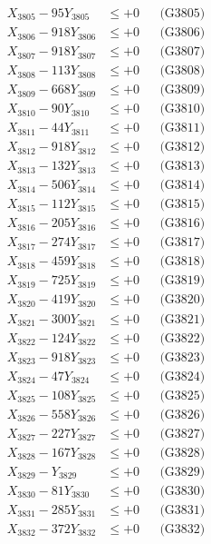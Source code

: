 \documentclass[a4paper,10pt]{article}
\begin{document}
{\begin{align}
X_{3805} - 95Y_{3805} &\leq +0 && \text{(G3805)} \\
X_{3806} - 918Y_{3806} &\leq +0 && \text{(G3806)} \\
X_{3807} - 918Y_{3807} &\leq +0 && \text{(G3807)} \\
X_{3808} - 113Y_{3808} &\leq +0 && \text{(G3808)} \\
X_{3809} - 668Y_{3809} &\leq +0 && \text{(G3809)} \\
X_{3810} - 90Y_{3810} &\leq +0 && \text{(G3810)} \\
\allowbreak
X_{3811} - 44Y_{3811} &\leq +0 && \text{(G3811)} \\
X_{3812} - 918Y_{3812} &\leq +0 && \text{(G3812)} \\
X_{3813} - 132Y_{3813} &\leq +0 && \text{(G3813)} \\
X_{3814} - 506Y_{3814} &\leq +0 && \text{(G3814)} \\
X_{3815} - 112Y_{3815} &\leq +0 && \text{(G3815)} \\
X_{3816} - 205Y_{3816} &\leq +0 && \text{(G3816)} \\
X_{3817} - 274Y_{3817} &\leq +0 && \text{(G3817)} \\
X_{3818} - 459Y_{3818} &\leq +0 && \text{(G3818)} \\
X_{3819} - 725Y_{3819} &\leq +0 && \text{(G3819)} \\
X_{3820} - 419Y_{3820} &\leq +0 && \text{(G3820)} \\
\allowbreak
X_{3821} - 300Y_{3821} &\leq +0 && \text{(G3821)} \\
X_{3822} - 124Y_{3822} &\leq +0 && \text{(G3822)} \\
X_{3823} - 918Y_{3823} &\leq +0 && \text{(G3823)} \\
X_{3824} - 47Y_{3824} &\leq +0 && \text{(G3824)} \\
X_{3825} - 108Y_{3825} &\leq +0 && \text{(G3825)} \\
X_{3826} - 558Y_{3826} &\leq +0 && \text{(G3826)} \\
X_{3827} - 227Y_{3827} &\leq +0 && \text{(G3827)} \\
X_{3828} - 167Y_{3828} &\leq +0 && \text{(G3828)} \\
X_{3829} - Y_{3829} &\leq +0 && \text{(G3829)} \\
X_{3830} - 81Y_{3830} &\leq +0 && \text{(G3830)} \\
\allowbreak
X_{3831} - 285Y_{3831} &\leq +0 && \text{(G3831)} \\
X_{3832} - 372Y_{3832} &\leq +0 && \text{(G3832)} \\

\end{align}}
\end{document}
